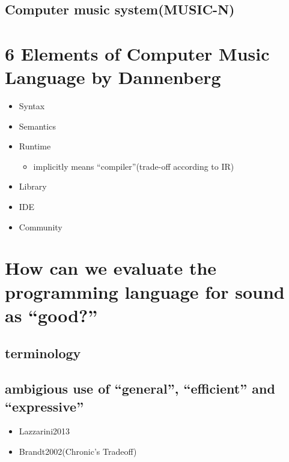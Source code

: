 \hypertarget{computer-music-systemmusic-n}{%
\subsection{Computer music
system(MUSIC-N)}\label{computer-music-systemmusic-n}}

\hypertarget{elements-of-computer-music-language-by-dannenberg}{%
\section{6 Elements of Computer Music Language by
Dannenberg}\label{elements-of-computer-music-language-by-dannenberg}}

\begin{itemize}
\tightlist
\item
  Syntax
\item
  Semantics
\item
  Runtime

  \begin{itemize}
  \tightlist
  \item
    implicitly means ``compiler''(trade-off according to IR)
  \end{itemize}
\item
  Library
\item
  IDE
\item
  Community
\end{itemize}

\hypertarget{how-can-we-evaluate-the-programming-language-for-sound-as-good}{%
\section{How can we evaluate the programming language for sound as
``good?''}\label{how-can-we-evaluate-the-programming-language-for-sound-as-good}}

\hypertarget{terminology}{%
\subsection{terminology}\label{terminology}}

\hypertarget{ambigious-use-of-general-efficient-and-expressive}{%
\subsection{ambigious use of ``general'', ``efficient'' and
``expressive''}\label{ambigious-use-of-general-efficient-and-expressive}}

\begin{itemize}
\tightlist
\item
  Lazzarini2013
\item
  Brandt2002(Chronic's Tradeoff)
\end{itemize}

